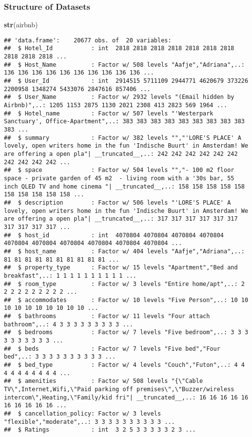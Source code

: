 \documentclass[]{article}
\newenvironment{Shaded}{\begin{snugshade}}{\end{snugshade}}
\newcommand{\KeywordTok}[1]{\textcolor[rgb]{0.13,0.29,0.53}{\textbf{#1}}}
\newcommand{\NormalTok}[1]{#1}
\begin{document}
\hypertarget{structure-of-datasets}{%
\subsubsection{Structure of Datasets}\label{structure-of-datasets}}

\begin{Shaded}
\begin{Highlighting}[]
\KeywordTok{str}\NormalTok{(airbnb)}
\end{Highlighting}
\end{Shaded}

\begin{verbatim}
## 'data.frame':    20677 obs. of  20 variables:
##  $ Hotel_Id           : int  2818 2818 2818 2818 2818 2818 2818 2818 2818 2818 ...
##  $ Host_Name          : Factor w/ 508 levels "Aafje","Adriana",..: 136 136 136 136 136 136 136 136 136 136 ...
##  $ User_Id            : int  2914515 5711109 2944771 4620679 373226 2200958 1348274 5433076 2847616 857406 ...
##  $ User_Name          : Factor w/ 2932 levels "(Email hidden by Airbnb)",..: 1205 1153 2875 1130 2021 2308 413 2823 569 1964 ...
##  $ Hotel_name         : Factor w/ 507 levels "'Westerpark Sanctuary', Office-Apartment",..: 383 383 383 383 383 383 383 383 383 383 ...
##  $ summary            : Factor w/ 382 levels "","'LORE'S PLACE' A lovely, open writers home in the fun 'Indische Buurt' in Amsterdam! We are offering a open pla"| __truncated__,..: 242 242 242 242 242 242 242 242 242 242 ...
##  $ space              : Factor w/ 504 levels "","- 100 m2 floor space - private garden of 45 m2  - living room with a '30s bar, 55 inch QLED TV and home cinema "| __truncated__,..: 158 158 158 158 158 158 158 158 158 158 ...
##  $ description        : Factor w/ 506 levels "'LORE'S PLACE' A lovely, open writers home in the fun 'Indische Buurt' in Amsterdam! We are offering a open pla"| __truncated__,..: 317 317 317 317 317 317 317 317 317 317 ...
##  $ host_id            : int  4070804 4070804 4070804 4070804 4070804 4070804 4070804 4070804 4070804 4070804 ...
##  $ host_name          : Factor w/ 404 levels "Aafje","Adriana",..: 81 81 81 81 81 81 81 81 81 81 ...
##  $ property_type      : Factor w/ 15 levels "Apartment","Bed and breakfast",..: 1 1 1 1 1 1 1 1 1 1 ...
##  $ room_type          : Factor w/ 3 levels "Entire home/apt",..: 2 2 2 2 2 2 2 2 2 2 ...
##  $ accommodates       : Factor w/ 10 levels "Five Person",..: 10 10 10 10 10 10 10 10 10 10 ...
##  $ bathrooms          : Factor w/ 11 levels "Four attach bathroom",..: 4 3 3 3 3 3 3 3 3 3 ...
##  $ bedrooms           : Factor w/ 7 levels "Five bedroom",..: 3 3 3 3 3 3 3 3 3 3 ...
##  $ beds               : Factor w/ 7 levels "Five bed","Four bed",..: 3 3 3 3 3 3 3 3 3 3 ...
##  $ bed_type           : Factor w/ 4 levels "Couch","Futon",..: 4 4 4 4 4 4 4 4 4 4 ...
##  $ amenities          : Factor w/ 508 levels "{\"Cable TV\",Internet,Wifi,\"Paid parking off premises\",\"Buzzer/wireless intercom\",Heating,\"Family/kid fri"| __truncated__,..: 16 16 16 16 16 16 16 16 16 16 ...
##  $ cancellation_policy: Factor w/ 3 levels "flexible","moderate",..: 3 3 3 3 3 3 3 3 3 3 ...
##  $ Ratings            : int  3 2 5 3 3 3 3 3 2 3 ...
\end{verbatim}
\end{document}
